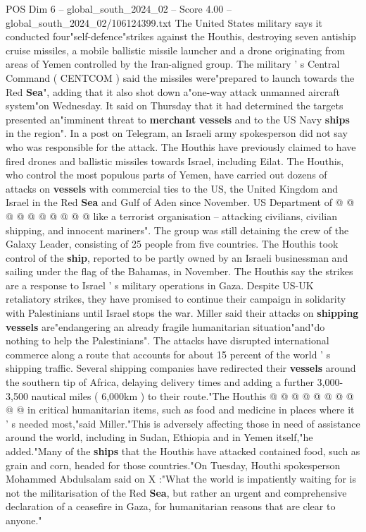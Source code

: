 \begin{textsample}{POS Dim 6 – global\_south\_2024\_02 – Score 4.00 – global\_south\_2024\_02/106124399.txt}  \label{ex:f6_pos_167}
The United States military says it conducted four"self-defence"strikes against the Houthis, destroying seven antiship cruise missiles, a mobile ballistic missile launcher and a drone originating from areas of Yemen controlled by the Iran-aligned group.
The military ' s Central Command ( CENTCOM ) said the missiles were"prepared to launch towards the Red \textbf{Sea}", adding that it also shot down a"one-way attack unmanned aircraft system"on Wednesday.
It said on Thursday that it had determined the targets presented an"imminent threat to \textbf{merchant} \textbf{vessels} and to the US Navy \textbf{ships} in the region".
In a post on Telegram, an Israeli army spokesperson did not say who was responsible for the attack.
The Houthis have previously claimed to have fired drones and ballistic missiles towards Israel, including Eilat.
The Houthis, who control the most populous parts of Yemen, have carried out dozens of attacks on \textbf{vessels} with commercial ties to the US, the United Kingdom and Israel in the Red \textbf{Sea} and Gulf of Aden since November.
US Department of @ @ @ @ @ @ @ @ @ @ like a terrorist organisation -- attacking civilians, civilian shipping, and innocent mariners".
The group was still detaining the crew of the Galaxy Leader, consisting of 25 people from five countries.
The Houthis took control of the \textbf{ship}, reported to be partly owned by an Israeli businessman and sailing under the flag of the Bahamas, in November.
The Houthis say the strikes are a response to Israel ' s military operations in Gaza.
Despite US-UK retaliatory strikes, they have promised to continue their campaign in solidarity with Palestinians until Israel stops the war.
Miller said their attacks on \textbf{shipping} \textbf{vessels} are"endangering an already fragile humanitarian situation"and"do nothing to help the Palestinians".
The attacks have disrupted international commerce along a route that accounts for about 15 percent of the world ' s shipping traffic.
Several shipping companies have redirected their \textbf{vessels} around the southern tip of Africa, delaying delivery times and adding a further 3,000-3,500 nautical miles ( 6,000km ) to their route."The Houthis @ @ @ @ @ @ @ @ @ @ in critical humanitarian items, such as food and medicine in places where it ' s needed most,"said Miller."This is adversely affecting those in need of assistance around the world, including in Sudan, Ethiopia and in Yemen itself,"he added."Many of the \textbf{ships} that the Houthis have attacked contained food, such as grain and corn, headed for those countries."On Tuesday, Houthi spokesperson Mohammed Abdulsalam said on X :"What the world is impatiently waiting for is not the militarisation of the Red \textbf{Sea}, but rather an urgent and comprehensive declaration of a ceasefire in Gaza, for humanitarian reasons that are clear to anyone."

\end{textsample}

